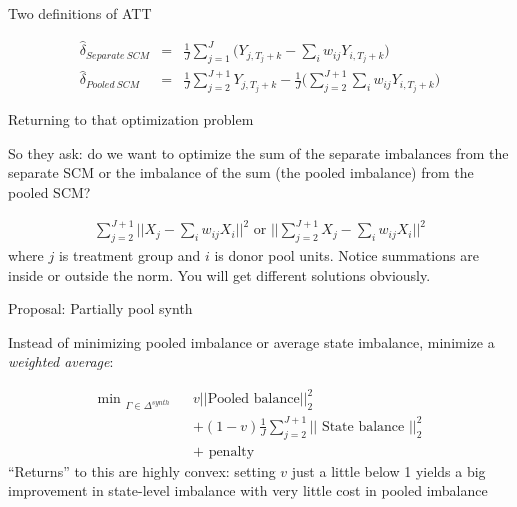 \documentclass{beamer}
\begin{document}
\begin{frame}{Two definitions of ATT}


\begin{eqnarray*}
\widehat{\delta}_{Separate\ SCM} &=& \frac{1}{J} \sum_{j=1}^J \bigg ( Y_{j,T_j+k} - \sum_i w_{ij} Y_{i,T_j+k} \bigg ) \\
\widehat{\delta}_{Pooled\ SCM}&=& \frac{1}{J} \sum_{j=2}^{J+1} Y_{j,T_j+k} - \frac{1}{J} \bigg ( \sum_{j=2}^{J+1} \sum_i w_{ij} Y_{i,T_j+k} \bigg )
\end{eqnarray*}

\end{frame}

\begin{frame}{Returning to that optimization problem}

So they ask: do we want to optimize the sum of the separate imbalances from the separate SCM or the imbalance of the sum (the pooled imbalance) from the pooled SCM?

\begin{eqnarray*}
\sum_{j=2}^{J+1} || X_j - \sum_i w_{ij}X_i ||^2\textrm{   or  } ||\sum_{j=2}^{J+1} X_j - \sum_i w_{ij} X_i ||^2
\end{eqnarray*}where $j$ is treatment group and $i$ is donor pool units. Notice summations are inside or outside the norm. You will get different solutions obviously.
\end{frame}













\begin{frame}{Proposal: Partially pool synth}

Instead of minimizing pooled imbalance or average state imbalance, minimize a \emph{weighted average}:

\begin{eqnarray*}
\textrm{min  }_{\Gamma \in \Delta^{synth}}  &&v|| \textrm{Pooled balance} ||^2_2 \\
&&+ (1-v) \frac{1}{J} \sum_{j=2}^{J+1} ||\textrm{ State balance } ||^2_2 \\
&&+ \textrm{ penalty }
\end{eqnarray*}``Returns'' to this are highly convex: setting $v$ just a little below 1 yields a big improvement in state-level imbalance with very little cost in pooled imbalance

\end{frame}
\end{document}
